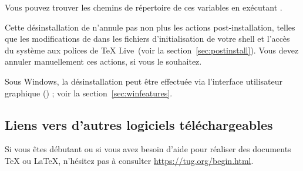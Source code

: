 \documentclass[german, english, french, 12pt]{article}
\renewcommand{\TL}{\TeX{} Live\xspace}%
\begin{document}
\noindent Vous pouvez trouver les chemins de répertoire de ces variables en
exécutant .

Cette désinstallation de  n'annule pas non plus les actions
post-installation, telles que les modifications de  dans les
fichiers d'initialisation de votre shell et l'accès du système aux polices de
\TL\ (voir la section~\ref{sec:postinstall}). Vous devez annuler manuellement
ces actions, si vous le souhaitez.

Sous Windows, la désinstallation peut être effectuée via l'interface utilisateur
graphique (\GUI) ; voir la section~\ref{sec:winfeatures}.

\subsection{Liens vers d'autres logiciels téléchargeables}

Si vous êtes débutant ou si vous avez besoin d'aide pour réaliser des documents
\TeX{} ou \LaTeX{}, n'hésitez pas à consulter \url{https://tug.org/begin.html}.

\end{document}

